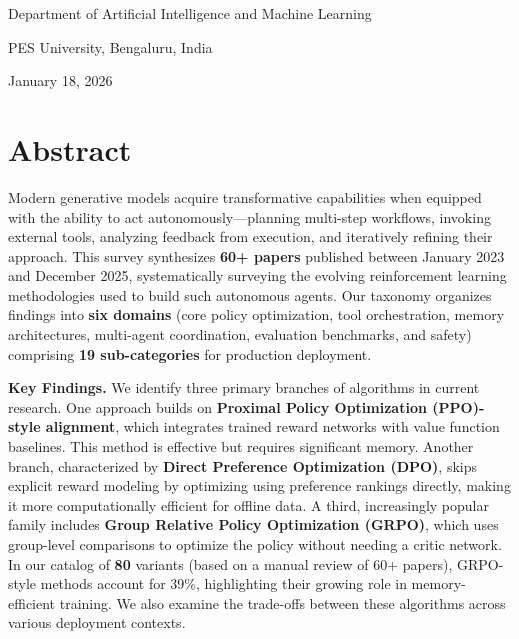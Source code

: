 \documentclass[12pt,a4paper]{report}
\theoremstyle{definition}
\newcommand{\reportdate}{January 18, 2026}
\newcommand{\methodN}{80}
\begin{document}
\begin{titlepage}
	    \vspace{0.4cm}
	    {\large Department of Artificial Intelligence and Machine Learning\par}
	    {\large PES University, Bengaluru, India\par}
	    \vspace{0.4cm}
	    {\large \reportdate\par}
\end{titlepage}
\hypersetup{pageanchor=true}

\chapter*{Abstract}

Modern generative models acquire transformative capabilities when equipped with the ability to act autonomously---planning multi-step workflows, invoking external tools, analyzing feedback from execution, and iteratively refining their approach.
 This survey synthesizes \textbf{60+ papers} published between January 2023 and December 2025, systematically surveying the evolving reinforcement learning methodologies used to build such autonomous agents. Our taxonomy organizes findings into \textbf{six domains} (core policy optimization, tool orchestration, memory architectures, multi-agent coordination, evaluation benchmarks, and safety) comprising \textbf{19 sub-categories} for production deployment.

\textbf{Key Findings.} We identify three primary branches of algorithms in current research. One approach builds on \textbf{Proximal Policy Optimization (PPO)-style alignment}, which integrates trained reward networks with value function baselines.
 This method is effective but requires significant memory. Another branch, characterized by \textbf{Direct Preference Optimization (DPO)}, skips explicit reward modeling
 by optimizing using preference rankings directly, making it more computationally efficient for offline data.
 A third, increasingly popular family includes \textbf{Group Relative Policy Optimization (GRPO)}, which uses group-level comparisons to optimize the policy without needing a critic network. In our catalog of \textbf{\methodN} variants (based on a manual review of 60+ papers), GRPO-style methods account for 39\%, highlighting their growing role in memory-efficient training. We also examine the trade-offs between these algorithms across various deployment contexts.
\end{document}
